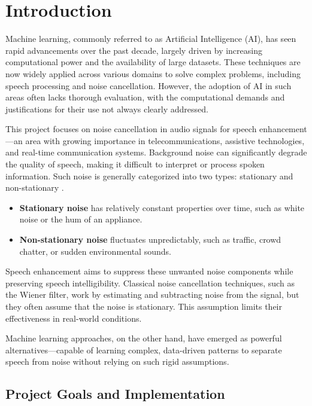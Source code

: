 \graphicspath{{content/chapters/1_introduction/figures}}
\chapter{Introduction}
\label{chp:introduction}

Machine learning, commonly referred to as Artificial Intelligence (AI), has seen rapid advancements over the past decade, largely driven by increasing computational power and the availability of large datasets. These techniques are now widely applied across various domains to solve complex problems, including speech processing and noise cancellation. However, the adoption of AI in such areas often lacks thorough evaluation, with the computational demands and justifications for their use not always clearly addressed.

This project focuses on noise cancellation in audio signals for speech enhancement—an area with growing importance in telecommunications, assistive technologies, and real-time communication systems. Background noise can significantly degrade the quality of speech, making it difficult to interpret or process spoken information. Such noise is generally categorized into two types: stationary and non-stationary \cite{loizou2013speech}.

\begin{itemize}
    \item \textbf{Stationary noise} has relatively constant properties over time, such as white noise or the hum of an appliance.
    \item \textbf{Non-stationary noise} fluctuates unpredictably, such as traffic, crowd chatter, or sudden environmental sounds.
\end{itemize}

Speech enhancement aims to suppress these unwanted noise components while preserving speech intelligibility. Classical noise cancellation techniques, such as the Wiener filter, work by estimating and subtracting noise from the signal, but they often assume that the noise is stationary. This assumption limits their effectiveness in real-world conditions. 

Machine learning approaches, on the other hand, have emerged as powerful alternatives—capable of learning complex, data-driven patterns to separate speech from noise without relying on such rigid assumptions.

\section{Project Goals and Implementation}

